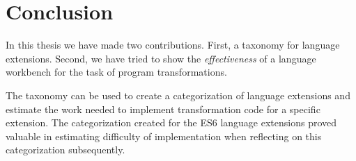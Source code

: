 
\chapter{Conclusion} %

\label{Chapter7} 


In this thesis we have made two contributions. First, a taxonomy for language extensions. Second, we have tried to show the \textit{effectiveness} of a language workbench for the task of program transformations. 

The taxonomy can be used to create a categorization of language extensions and estimate the work needed to implement transformation code for a specific extension. The categorization created for the ES6 language extensions proved valuable in estimating difficulty of implementation when reflecting on this categorization subsequently.